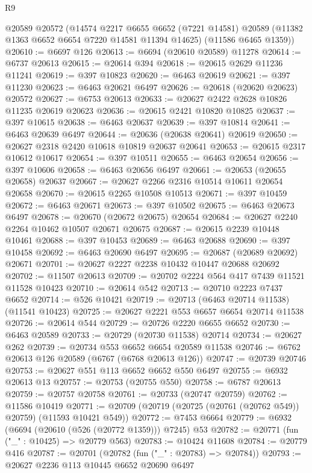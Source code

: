 \begin{lexlean}{R9}
\begin{coremodule}
{{{{{{{{{{{{{{{{{{{{{{{{{{{{{{{{{{{{{{{{{{{{{{{{{{{{{{{{{{{{{{{{{{{{{{{{{{{{{{{{{{{{    @20589
    @20572
    (@14574
      @2217
      @6655
      @6652
      (@7221 @14581)
      @20589
      (@11382 @1363 @6652 @6654 @7220 @14581 @11394 @14625)
      (@11586 @6465 @1359))
@20610 := @6697 @126
@20613 := @6694 (@20610 @20589) @11278
@20614 := @6737 @20613
@20615 := @20614 @394
@20618 := @20615 @2629 @11236 @11241
@20619 := @397 @10823
@20620 := @6463 @20619
@20621 := @397 @11230
@20623 := @6463 @20621 @6497
@20626 := @20618 (@20620 @20623) @20572
@20627 := @6753 @20613
@20633 := @20627 @2422 @2628 @10826 @11235 @20619 @20623
@20636 := @20615 @2421 @10820 @10825
@20637 := @397 @10615
@20638 := @6463 @20637
@20639 := @397 @10814
@20641 := @6463 @20639 @6497
@20644 := @20636 (@20638 @20641) @20619
@20650 := @20627 @2318 @2420 @10618 @10819 @20637 @20641
@20653 := @20615 @2317 @10612 @10617
@20654 := @397 @10511
@20655 := @6463 @20654
@20656 := @397 @10606
@20658 := @6463 @20656 @6497
@20661 := @20653 (@20655 @20658) @20637
@20667 := @20627 @2266 @2316 @10514 @10611 @20654 @20658
@20670 := @20615 @2265 @10508 @10513
@20671 := @397 @10459
@20672 := @6463 @20671
@20673 := @397 @10502
@20675 := @6463 @20673 @6497
@20678 := @20670 (@20672 @20675) @20654
@20684 := @20627 @2240 @2264 @10462 @10507 @20671 @20675
@20687 := @20615 @2239 @10448 @10461
@20688 := @397 @10453
@20689 := @6463 @20688
@20690 := @397 @10458
@20692 := @6463 @20690 @6497
@20695 := @20687 (@20689 @20692) @20671
@20701 := @20627 @2227 @2238 @10432 @10447 @20688 @20692
@20702 := @11507 @20613
@20709 := @20702 @2224 @564 @417 @7439 @11521 @11528 @10423
@20710 := @20614 @542
@20713 := @20710 @2223 @7437 @6652
@20714 := @526 @10421
@20719 := @20713 (@6463 @20714 @11538) (@11541 @10423)
@20725 := @20627 @2221 @553 @6657 @6654 @20714 @11538
@20726 := @20614 @544
@20729 := @20726 @2220 @6655 @6652
@20730 := @6463 @20589
@20733 := @20729 (@20730 @11538) @20714
@20734 := @20627 @262
@20739 := @20734 @553 @6652 @6654 @20589 @11538
@20746 := @6762 @20613 @126 @20589 (@6767 (@6768 @20613 @126))
@20747 := @20739 @20746
@20753 := @20627 @551 @113 @6652 @6652 @550 @6497
@20755 := @6932 @20613 @13
@20757 := @20753 (@20755 @550)
@20758 := @6787 @20613
@20759 := @20757 @20758
@20761 := @20733 (@20747 @20759)
@20762 := @11586 @10419
@20771 := @20709 (@20719 (@20725 (@20761 (@20762 @549)) @20759) (@11593 @10421 @549))
@20772 := @7453 @6664
@20779 := @6932 (@6694 (@20610 (@526 (@20772 @1359))) @7245) @53
@20782 := @20771 (fun ("_" : @10425) => @20779 @563)
@20783 := @10424 @11608
@20784 := @20779 @416
@20787 := @20701 (@20782 (fun ("_" : @20783) => @20784))
@20793 := @20627 @2236 @113 @10445 @6652 @20690 @6497
}}}}}}}}}}}}}}}}}}}}}}}}}}}}}}}}}}}}}}}}}}}}}}}}}}}}}}}}}}}}}}}}}}}}}}}}}}}}}}}}}}}}
\end{coremodule}
\end{lexlean}
